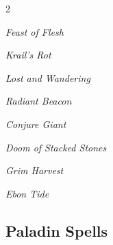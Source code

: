 \documentclass[10pt,a4paper,twoside,bg=print,twocolumn,openany,nodeprecatedcode]{dndbook}
\begin{document}
\begin{description}
\begin{multicols}{2}
{\par \vspace { 9pt plus 3pt minus 3pt } \noindent  {} \nopagebreak }

\begin{description}
\item \textit{Feast of Flesh}
\item \textit{Krail's Rot}
\item \textit{Lost and Wandering}
\item \textit{Radiant Beacon}
\end{description}

{\par \vspace { 9pt plus 3pt minus 3pt } \noindent  {} \nopagebreak }

\begin{description}
\item \textit{Conjure Giant}
\item \textit{Doom of Stacked Stones}
\item \textit{Grim Harvest}
\end{description}

{\par \vspace { 9pt plus 3pt minus 3pt } \noindent  {} \nopagebreak }

\begin{description}
\item \textit{Ebon Tide}
\end{description}

\end{multicols}

\end{description}

\subsection{Paladin Spells}
\end{document}
